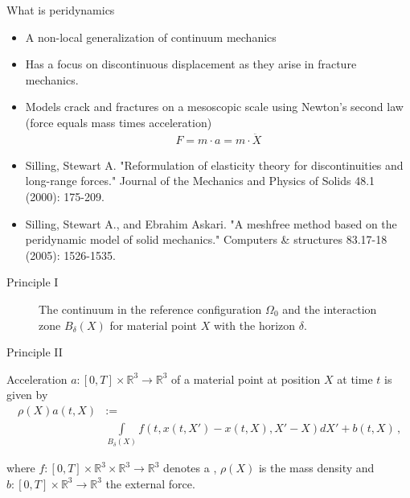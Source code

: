 \documentclass[\classoption]{beamer}
\newcommand{\R}{\mathbb{R}}
\newcommand{\ftime}{[0,T]}
\begin{document}
\begin{frame}{What is peridynamics}

\begin{itemize}
\item A non-local generalization of continuum mechanics 
\item Has a focus on discontinuous displacement as they arise in fracture mechanics.
\item Models crack and fractures on a mesoscopic scale using Newton's second law (force equals mass times acceleration)
\begin{align*}
F = m \cdot a = m \cdot \ddot X
\end{align*}
\end{itemize}
\small
\begin{itemize}
\item Silling, Stewart A. "Reformulation of elasticity theory for discontinuities and long-range forces." Journal of the Mechanics and Physics of Solids 48.1 (2000): 175-209.
\item Silling, Stewart A., and Ebrahim Askari. "A meshfree method based on the peridynamic model of solid mechanics." Computers \& structures 83.17-18 (2005): 1526-1535.
\end{itemize}
\end{frame}

\begin{frame}{Principle I}
\begin{figure}[!htbp]
\caption{The continuum in the reference configuration $\Omega_0$ and the interaction zone $B_\delta(X)$ for material point $X$ with the horizon $\delta$.}
\label{fig::chapter2:02}
\end{figure}

\end{frame}

\begin{frame}{Principle II}

\begin{block}{Acceleration $a:\ftime\times\R^3\rightarrow\R^3$}
of a material point at position $X$ at time $t$ is given by
\begin{align*}
\rho(X)a(t,X)&:= \\
&\int\limits_{B_\delta(X)} f\left(t,x(t,X')-x(t,X), X'-X\right)dX' + b(t,X)\,\text{,}
\label{eq::chapter2:01}
\end{align*}
\end{block}
where $f:[0,T]\times\R^3\times\R^3\rightarrow\R^3$ denotes a , $\rho(X)$ is the mass density and $b:[0,T]\times\mathbb{R}^3\rightarrow\mathbb{R}^3$ the external force. 
\end{frame}
\end{document}
